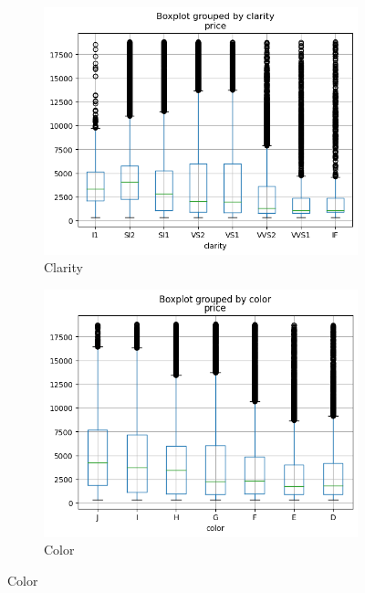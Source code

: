 \documentclass[11pt,letterpaper]{article}
\begin{document}
\begin{figure}[H]
    \centering
    \begin{subfigure}[b]{0.3\textwidth}
        \centering
        \includegraphics[width=\textwidth]{../Figures/Question-1/clarityBox.png}
        \caption{Clarity}
        \label{fig:clarityBox}
    \end{subfigure}
    \hfill
    \begin{subfigure}[b]{0.3\textwidth}
        \centering
        \includegraphics[width=\textwidth]{../Figures/Question-1/colorBox.png}
        \caption{Color}
        \label{fig:colorBox}
    \end{subfigure}

\end{figure}
\end{document}
